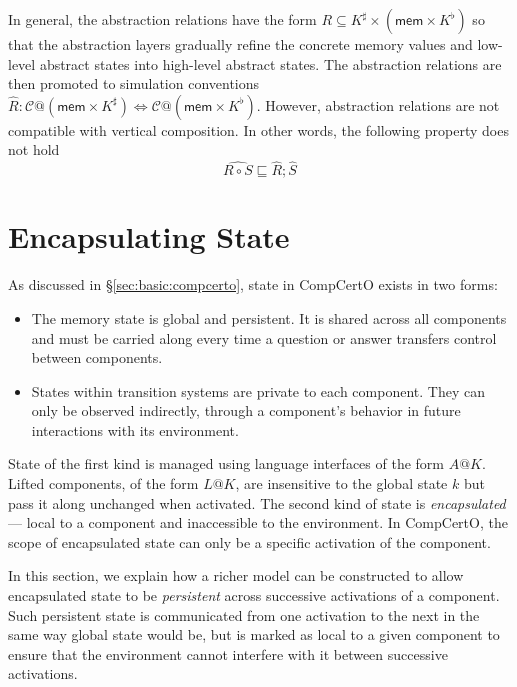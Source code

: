 \documentclass[acmsmall,screen,review,anonymous]{acmart}
\newcommand{\kw}[1]{\ensuremath{ \mathsf{#1} }}
\begin{document}
In general, the abstraction relations have the form
$R \subseteq K^\sharp \times (\kw{mem} \times K^\flat)$
so that the abstraction layers gradually refine
the concrete memory values and low-level abstract states
into high-level abstract states.
The abstraction relations are then promoted to simulation conventions
$\hat{R}: \mathcal{C}@(\kw{mem}\times K^\sharp)
\Leftrightarrow \mathcal{C}@(\kw{mem}\times K^\flat)$.
However, abstraction relations are not compatible with
vertical composition.
In other words, the following property does not hold
\[
   \hat{R \circ S} \sqsubseteq \hat{R}; \hat{S}
\]



\section{Encapsulating State} \label{sec:encap} %


As discussed in \S\ref{sec:basic:compcerto},
state in CompCertO exists in two forms:
\begin{itemize}
  \item The memory state is global and persistent.
    It is shared across all components
    and must be carried along
    every time a question or answer transfers control
    between components.
  \item States within transition systems
    are private to each component.
    They can only be observed indirectly,
    through a component's behavior
    in future interactions with its environment.
\end{itemize}
State of the first kind
is managed using language interfaces
of the form $A@K$.
Lifted components, of the form $L@K$,
are insensitive to the global state $k$
but pass it along unchanged
when activated.
The second kind of state is \emph{encapsulated}---%
local to a component
and inaccessible to the environment.
In CompCertO, the scope of encapsulated state
can only be a specific activation of the component.

In this section,
we explain how a richer model can be constructed
to allow encapsulated state
to be \emph{persistent} across
successive activations of a component.
Such persistent state
is communicated from one activation to the next
in the same way global state would be,
but is marked as local to a given component
to ensure that the environment cannot interfere
with it between successive activations.
\end{document}
